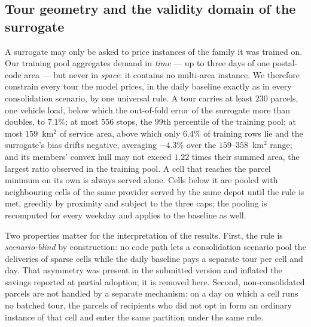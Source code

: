 \documentclass[preprint,12pt,authoryear]{elsarticle}
\begin{document}
\subsection{Tour geometry and the validity domain of the surrogate}
\label{sec:tour_rule}

A surrogate may only be asked to price instances of the family it was trained on. Our training pool aggregates demand in \emph{time} --- up to three days of one postal-code area --- but never in \emph{space}: it contains no multi-area instance. We therefore constrain every tour the model prices, in the daily baseline exactly as in every consolidation scenario, by one universal rule. A tour carries at least $230$ parcels, one vehicle load, below which the out-of-fold error of the surrogate more than doubles, to $7.1\%$; at most $556$ stops, the $99$th percentile of the training pool; at most $159$~km$^2$ of service area, above which only $6.4\%$ of training rows lie and the surrogate's bias drifts negative, averaging $-4.3\%$ over the $159$--$358$~km$^2$ range; and its members' convex hull may not exceed $1.22$ times their summed area, the largest ratio observed in the training pool. A cell that reaches the parcel minimum on its own is always served alone. Cells below it are pooled with neighbouring cells of the same provider served by the same depot until the rule is met, greedily by proximity and subject to the three caps; the pooling is recomputed for every weekday and applies to the baseline as well.

Two properties matter for the interpretation of the results. First, the rule is \emph{scenario-blind} by construction: no code path lets a consolidation scenario pool the deliveries of sparse cells while the daily baseline pays a separate tour per cell and day. That asymmetry was present in the submitted version and inflated the savings reported at partial adoption; it is removed here. Second, non-consolidated parcels are not handled by a separate mechanism: on a day on which a cell runs no batched tour, the parcels of recipients who did not opt in form an ordinary instance of that cell and enter the same partition under the same rule.
\end{document}
